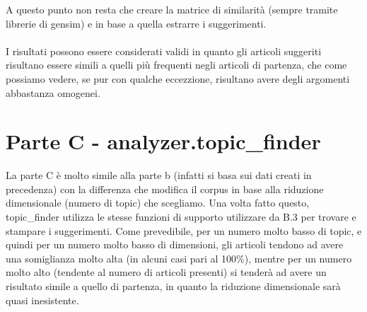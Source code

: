 \documentclass{article}
\begin{document}
A questo punto non resta che creare la matrice di similarità (sempre tramite librerie di gensim) e in base a quella estrarre i suggerimenti.\\
\\I risultati possono essere considerati validi in quanto gli articoli suggeriti risultano essere simili a quelli più frequenti negli articoli di partenza, che come possiamo vedere, se pur con qualche eccezzione, risultano avere degli argomenti abbastanza omogenei.
\section{Parte C - analyzer.topic\_finder}
La parte C è molto simile alla parte b (infatti si basa sui dati creati in precedenza) con la differenza che modifica il corpus in base alla riduzione dimensionale (numero di topic) che scegliamo.
Una volta fatto questo, topic\_finder utilizza le stesse funzioni di supporto utilizzare da B.3 per trovare e stampare i suggerimenti.
Come prevedibile, per un numero molto basso di topic, e quindi per un numero molto basso di dimensioni, gli articoli tendono ad avere una somiglianza molto alta (in alcuni casi pari al 100\%), mentre per un numero molto alto (tendente al numero di articoli presenti) si tenderà ad avere un risultato simile a quello di partenza, in quanto la riduzione dimensionale sarà quasi inesistente.
\end{document}
